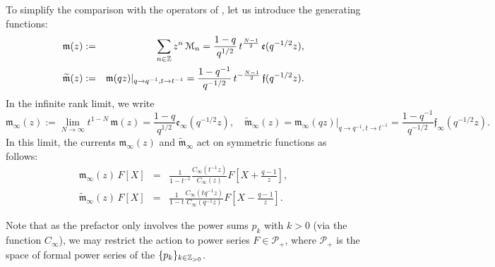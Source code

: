 To simplify the comparison with the operators of \cite{BGLX}, let us introduce the generating functions:
\begin{eqnarray}{\mathfrak m}(z)&:=&\sum_{n\in {\mathbb Z}} z^n\, {\mathcal M}_n= \frac{1-q}{q^{1/2}} \,t^{\frac{N-1}{2}}\, {\mathfrak e}(q^{-1/2}z)\label{mcurdefone}, \\
\widetilde{\mathfrak m}(z)&:=&{\mathfrak m}(q z)\vert_{q\to q^{-1},t\to t^{-1}}=\frac{1-q^{-1}}{q^{-1/2}}\,t^{-\frac{N-1}{2}}\, {\mathfrak f}(q^{-1/2}z).\label{mcurdeftwo}\end{eqnarray}
In the infinite rank limit, we write
$${\mathfrak m}_\infty(z):=\lim_{N\to\infty} t^{1-N}\,  {\mathfrak m}(z)
=\frac{1-q}{q^{1/2}}{\mathfrak e}_\infty(q^{-1/2}z),\quad 
\widetilde{\mathfrak m}_\infty(z)={\mathfrak m}_\infty(q z)\vert_{q\to q^{-1},t\to t^{-1}}
=\frac{1-q^{-1}}{q^{-1/2}}{\mathfrak f}_\infty(q^{-1/2}z) .$$
In this limit, the currents ${\mathfrak m}_\infty(z)$ and $\widetilde{\mathfrak m}_\infty$ act on symmetric functions as follows:
\begin{eqnarray}
{\mathfrak m}_\infty(z)\, F[X] &=&
\frac{1}{1-t^{-1}} \frac{C_\infty(t^{-1}z)}{C_\infty(z)} F\left[ X+\frac{q-1}{z}\right],\label{bosom}\\
\widetilde{\mathfrak m}_\infty(z)\, F[X] &=&
\frac{1}{1-t} \frac{C_\infty(t q^{-1}z)}{C_\infty(q^{-1}z)} F\left[ X-\frac{q-1}{z}\right].\label{bosomt}
\end{eqnarray}


Note that as the prefactor only involves the power sums $p_k$ with $k>0$ (via the function $C_\infty$), we may restrict the action to power series $F\in {\mathcal P}_+$,
where ${\mathcal P}_+$ is the space of formal power series of the $\{p_k\}_{k\in {\mathbb Z}_{>0}}$.



